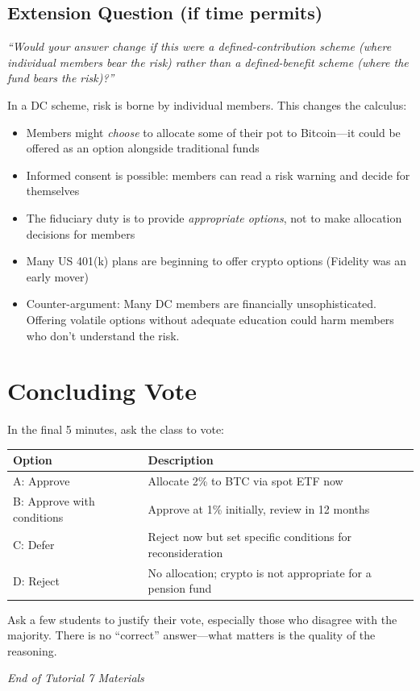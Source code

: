 \documentclass[11pt]{article}
\begin{document}
\subsection*{Extension Question (if time permits)}

\textit{``Would your answer change if this were a defined-contribution scheme (where individual members bear the risk) rather than a defined-benefit scheme (where the fund bears the risk)?''}

\medskip
In a DC scheme, risk is borne by individual members. This changes the calculus:
\begin{itemize}[leftmargin=*]
\item Members might \textit{choose} to allocate some of their pot to Bitcoin---it could be offered as an option alongside traditional funds
\item Informed consent is possible: members can read a risk warning and decide for themselves
\item The fiduciary duty is to provide \textit{appropriate options}, not to make allocation decisions for members
\item Many US 401(k) plans are beginning to offer crypto options (Fidelity was an early mover)
\item Counter-argument: Many DC members are financially unsophisticated. Offering volatile options without adequate education could harm members who don't understand the risk.
\end{itemize}

\section*{Concluding Vote}

In the final 5 minutes, ask the class to vote:

\begin{center}
\begin{tabular}{lp{8cm}}
\toprule
\textbf{Option} & \textbf{Description} \\
\midrule
A: Approve & Allocate 2\% to BTC via spot ETF now \\
B: Approve with conditions & Approve at 1\% initially, review in 12 months \\
C: Defer & Reject now but set specific conditions for reconsideration \\
D: Reject & No allocation; crypto is not appropriate for a pension fund \\
\bottomrule
\end{tabular}
\end{center}

Ask a few students to justify their vote, especially those who disagree with the majority. There is no ``correct'' answer---what matters is the quality of the reasoning.

\vfill
\begin{flushright}
\textit{End of Tutorial 7 Materials}
\end{flushright}
\end{document}
